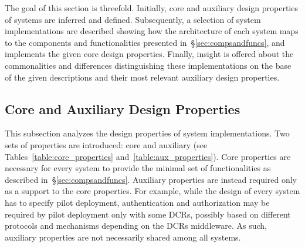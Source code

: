 \documentclass{sig-alternate}
\begin{document}

The goal of this section is threefold. Initially, core and auxiliary design
properties of \pilot systems are inferred and defined. Subsequently, a selection
of \pilot system implementations are described showing how the architecture of
each system maps to the components and functionalities presented
in~\S\ref{sec:compsandfuncs}, and implements the given core design properties.
Finally, insight is offered about the commonalities and differences
distinguishing these implementations on the base of the given descriptions and
their most relevant auxiliary design properties.


 

%
\subsection{Core and Auxiliary Design Properties}
\label{sec:properties}

This subsection analyzes the design properties of \pilot system implementations.
Two sets of properties are introduced: core and auxiliary (see
Tables~\ref{table:core_properties} and~\ref{table:aux_properties}). Core
properties are necessary for every \pilot system to provide the minimal set of
functionalities as described in~\S\ref{sec:compsandfuncs}. Auxiliary properties
are instead required only as a support to the core properties. For example,
while the design of every \pilot system has to specify pilot deployment,
authentication and authorization may be required by pilot deployment only with
some DCRs, possibly based on different protocols and mechanisms depending on the
DCRs middleware. As such, auxiliary properties are not necessarily shared among
all \pilot systems.

\end{document}
